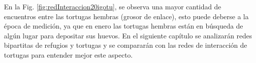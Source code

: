 En la Fig. \ref{fig:redInteraccion20igotu}, se observa una mayor cantidad de encuentros entre las tortugas hembras (grosor de enlace), esto puede deberse a la época de medición, ya que en enero las tortugas hembras están en búsqueda de algún lugar para depositar sus huevos. En el siguiente capítulo se analizarán redes bipartitas de refugios y tortugas y se compararán con las redes de interacción de tortugas para entender mejor este aspecto.
 
 
 
 
 
 
 

